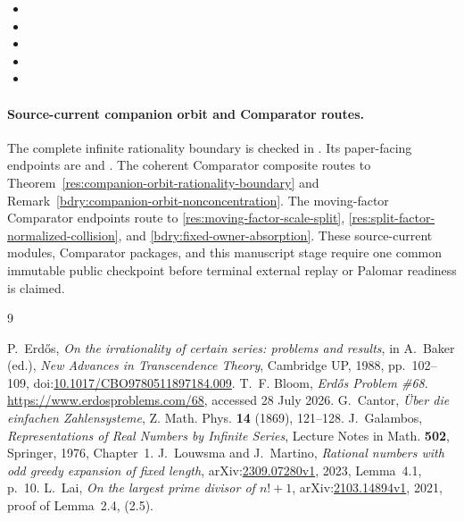 \documentclass[11pt]{article}
\begin{document}
\begin{itemize}[leftmargin=*]
\item {}
\item {}
\item {}
\item {}
\item {}
\end{itemize}

\begingroup
\raggedright
\paragraph{Source-current companion orbit and Comparator routes.}
The complete infinite rationality boundary is checked in
.  Its paper-facing
endpoints are
and
.
The coherent Comparator composite
 routes to
Theorem~\ref{res:companion-orbit-rationality-boundary} and
Remark~\ref{bdry:companion-orbit-nonconcentration}.  The moving-factor
Comparator endpoints route to \ref{res:moving-factor-scale-split},
\ref{res:split-factor-normalized-collision}, and
\ref{bdry:fixed-owner-absorption}.  These source-current modules, Comparator
packages, and this manuscript stage require one common immutable public
checkpoint before terminal external replay or Palomar readiness is claimed.
\par
\endgroup

\clearpage

\begin{thebibliography}{9}
\small
\raggedright
\setlength{\itemsep}{0pt}
 P.~Erd\H{o}s, \emph{On the irrationality of certain series:
  problems and results}, in A.~Baker (ed.), \emph{New Advances in Transcendence
  Theory}, Cambridge UP, 1988, pp.~102--109,
  doi:\href{https://doi.org/10.1017/CBO9780511897184.009}
  {10.1017/CBO9780511897184.009}.
 T.~F. Bloom, \emph{Erd\H{o}s Problem \#68}.
  \url{https://www.erdosproblems.com/68}, accessed 28 July 2026.
 G.~Cantor, \emph{\"Uber die einfachen Zahlensysteme},
  Z. Math. Phys. \textbf{14} (1869), 121--128.
 J.~Galambos, \emph{Representations of Real Numbers by
  Infinite Series}, Lecture Notes in Math. \textbf{502}, Springer, 1976,
  Chapter~1.
  J.~Louwsma and J.~Martino,
  \emph{Rational numbers with odd greedy expansion of fixed length},
  arXiv:\href{https://arxiv.org/abs/2309.07280}{2309.07280v1}, 2023,
  Lemma~4.1, p.~10.
  L.~Lai, \emph{On the largest prime divisor of $n!+1$},
  arXiv:\href{https://arxiv.org/abs/2103.14894}{2103.14894v1}, 2021,
  proof of Lemma~2.4, (2.5).
\end{thebibliography}
\end{document}

